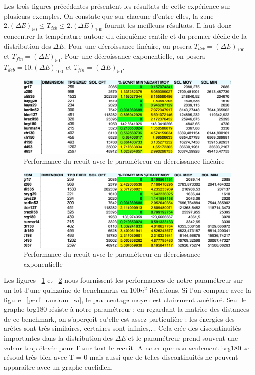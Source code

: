 \documentclass{article}%
\begin{document}
		Les trois figures précédentes présentent les résultats de cette expérience sur plusieurs exemples. On constate que sur chacune d'entre elles, la zone $ 2. (\Delta E)_{50} \leq T_{deb} \leq 2. (\Delta E)_{100} $ fournit les meilleurs résultats. Il faut donc concentrer la température autour du cinquième centile et du premier décile de la distribution des $ \Delta E $.
		Pour une décroissance linéaire, on posera $ T_{deb} = (\Delta E)_{100} $ et $ T_{fin} = (\Delta E)_{50} $. 
		Pour une décroissance exponentielle, on posera $ T_{deb} = 10.(\Delta E)_{100} $ et $ T_{fin} = (\Delta E)_{50} $.
		
	\begin{figure}[!h]
	\begin{center}
	\includegraphics[scale=0.4]{perf_lin.png}
	\caption{Performance du recuit avec le paramétreur en décroissance linéaire}
	\label{perf_lin}
	\end{center}
	\end{figure}
	
	\begin{figure}[!h]
	\begin{center}
	\includegraphics[scale=0.4]{perf_exp.png}
	\caption{Performance du recuit avec le paramétreur en décroissance exponentielle}
	\label{perf_exp}
	\end{center}
	\end{figure}
	
	Les figures ~\ref{perf_lin} et ~\ref{perf_exp} nous fournissent les performances de notre paramétreur sur un lot d'une quinzaine de benchmarks en $100n^2 $ itérations. Si l'on compare avec la figure ~\ref{perf_random_sa}, le pourcentage moyen est clairement amélioré. Seul le graphe brg180 résiste à notre paramétreur : en regardant la matrice des distances de ce benchmark, on s'aperçoit qu'elle est assez particulière : les énergies des arêtes sont très similaires, certaines sont infinies,... Cela crée des discontinuités importantes dans la distribution des $ \Delta E $ et le paramétreur prend souvent une valeur trop élevée pour T sur tout le recuit. A noter que non seulement brg180 se résoud très bien avec T = 0 mais aussi que de telles discontinuités ne peuvent apparaître avec un graphe euclidien.
	
\end{document}
